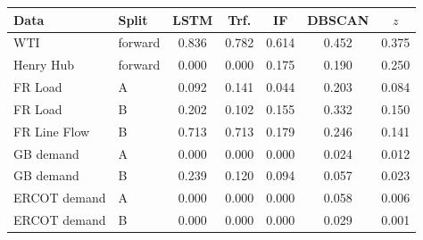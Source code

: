 \begin{tabular}{llccccc}
\toprule
Data & Split & LSTM & Trf. & IF & DBSCAN & $z$ \\
\midrule
WTI & forward & 0.836 & 0.782 & 0.614 & 0.452 & 0.375 \\
Henry Hub & forward & 0.000 & 0.000 & 0.175 & 0.190 & 0.250 \\
FR Load & A & 0.092 & 0.141 & 0.044 & 0.203 & 0.084 \\
FR Load & B & 0.202 & 0.102 & 0.155 & 0.332 & 0.150 \\
FR Line Flow & B & 0.713 & 0.713 & 0.179 & 0.246 & 0.141 \\
GB demand & A & 0.000 & 0.000 & 0.000 & 0.024 & 0.012 \\
GB demand & B & 0.239 & 0.120 & 0.094 & 0.057 & 0.023 \\
ERCOT demand & A & 0.000 & 0.000 & 0.000 & 0.058 & 0.006 \\
ERCOT demand & B & 0.000 & 0.000 & 0.000 & 0.029 & 0.001 \\
\bottomrule
\end{tabular}
